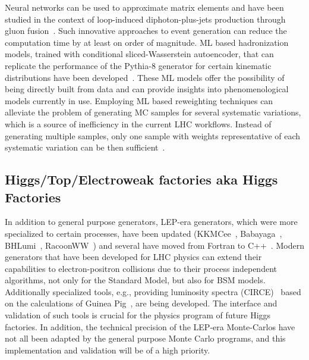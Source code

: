 \documentclass[10pt,a4paper]{article}
\begin{document}
Neural networks can be used to approximate matrix elements and have been
studied in the context of loop-induced diphoton-plus-jets production
through gluon
fusion~\cite{Moodie:2022flt}. Such
innovative approaches to event generation can reduce the computation
time by at least on order of magnitude. ML based hadronization models,
trained with conditional sliced-Wasserstein autoencoder, that can
replicate the performance of the Pythia-8 generator for certain
kinematic distributions have been
developed~\cite{Ilten:2022jfm,
Bierlich:2023fmh}. These ML models offer the possibility of being
directly built from data and can provide insights into phenomenological
models currently in use. Employing ML based reweighting techniques can
alleviate the problem of generating MC samples for several systematic
variations, which is a source of inefficiency in the current LHC
workflows. Instead of generating multiple samples, only one sample with
weights representative of each systematic variation can be then
sufficient~\cite{CMS:2024jdl}.

\subsection{Higgs/Top/Electroweak factories aka Higgs
Factories}\label{higgstopelectroweak-factories-aka-higgs-factories}

In addition to general purpose generators, LEP-era generators, which
were more specialized to certain processes, have been updated
(KKMCee~\cite{Jadach:1999vf},
Babayaga~\cite{CarloniCalame:2003yt},
BHLumi~\cite{Jadach:1991by},
RacoonWW~\cite{Denner:2000bj}) and several
have moved from Fortran to
C++~\cite{Jadach:2022mbe}. Modern
generators that have been developed for LHC physics can extend their
capabilities to electron-positron collisions due to their process
independent algorithms, not only for the Standard Model, but also for
BSM models. Additionally specialized tools, e.g., providing luminosity
spectra (CIRCE)~\cite{Ohl:1996fi}
based on the calculations of Guinea
Pig~\cite{Schulte:1998au}, are being
developed. The interface and validation of such tools is crucial for the
physics program of future Higgs factories. In addition, the technical
precision of the LEP-era Monte-Carlos have not all been
adapted by the general purpose Monte Carlo programs, and this
implementation and validation will be of a high priority.
\end{document}

